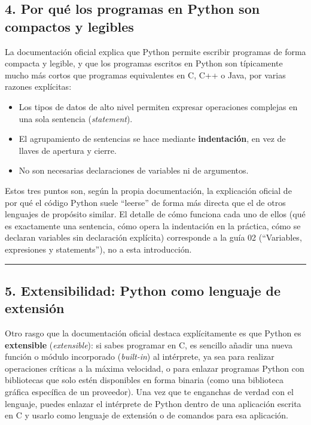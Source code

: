 \documentclass[
  doc,
  floatsintext,
  longtable,
  a4paper,
  nolmodern,
  notxfonts,
  notimes,
  12pt,
  colorlinks=true,linkcolor=blue,citecolor=blue,urlcolor=blue]{apa7}
\providecommand{\tightlist}{%
  \setlength{\itemsep}{0pt}\setlength{\parskip}{0pt}}
\begin{document}
\subsection{4. Por qué los programas en Python son compactos y
legibles}\label{por-quuxe9-los-programas-en-python-son-compactos-y-legibles}

La documentación oficial explica que Python permite escribir programas
de forma compacta y legible, y que los programas escritos en Python son
típicamente mucho más cortos que programas equivalentes en C, C++ o
Java, por varias razones explícitas:

\begin{itemize}
\tightlist
\item
  Los tipos de datos de alto nivel permiten expresar operaciones
  complejas en una sola sentencia (\emph{statement}).
\item
  El agrupamiento de sentencias se hace mediante \textbf{indentación},
  en vez de llaves de apertura y cierre.
\item
  No son necesarias declaraciones de variables ni de argumentos.
\end{itemize}

Estos tres puntos son, según la propia documentación, la explicación
oficial de por qué el código Python suele ``leerse'' de forma más
directa que el de otros lenguajes de propósito similar. El detalle de
cómo funciona cada uno de ellos (qué es exactamente una sentencia, cómo
opera la indentación en la práctica, cómo se declaran variables sin
declaración explícita) corresponde a la guía 02 (``Variables,
expresiones y statements''), no a esta introducción.

\begin{center}\rule{0.5\linewidth}{0.5pt}\end{center}

\subsection{5. Extensibilidad: Python como lenguaje de
extensión}\label{extensibilidad-python-como-lenguaje-de-extensiuxf3n}

Otro rasgo que la documentación oficial destaca explícitamente es que
Python es \textbf{extensible} (\emph{extensible}): si sabes programar en
C, es sencillo añadir una nueva función o módulo incorporado
(\emph{built-in}) al intérprete, ya sea para realizar operaciones
críticas a la máxima velocidad, o para enlazar programas Python con
bibliotecas que solo estén disponibles en forma binaria (como una
biblioteca gráfica específica de un proveedor). Una vez que te enganchas
de verdad con el lenguaje, puedes enlazar el intérprete de Python dentro
de una aplicación escrita en C y usarlo como lenguaje de extensión o de
comandos para esa aplicación.
\end{document}

